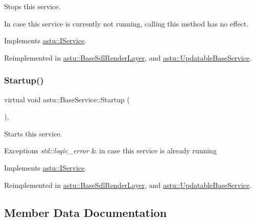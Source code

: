 Stops this service.

In case this service is currently not running, calling this method has no effect. 

Implements \hyperlink{classastu_1_1IService_a67643385e7cc17c31e0b3b49672b5856}{astu\+::\+I\+Service}.



Reimplemented in \hyperlink{classastu_1_1BaseSdlRenderLayer_a786ae49f41873d498ae0d22a0f3a5349}{astu\+::\+Base\+Sdl\+Render\+Layer}, and \hyperlink{classastu_1_1UpdatableBaseService_a7ad7e0201007878b6014361dd5ba82f9}{astu\+::\+Updatable\+Base\+Service}.

\mbox{\label{classastu_1_1BaseService_a59dade033dcb44dd32155c526a3a58e2}} 
\subsubsection{\texorpdfstring{Startup()}{Startup()}}
{\footnotesize\ttfamily virtual void astu\+::\+Base\+Service\+::\+Startup (\begin{DoxyParamCaption}{ }\end{DoxyParamCaption})\hspace{0.3cm}{\ttfamily [override]}, {\ttfamily [virtual]}}

Starts this service.


\begin{DoxyExceptions}{Exceptions}
{\em std\+::logic\+\_\+error} & in case this service is already running \\
\hline
\end{DoxyExceptions}


Implements \hyperlink{classastu_1_1IService_a7a09e485d116659f174aca9a8494fa55}{astu\+::\+I\+Service}.



Reimplemented in \hyperlink{classastu_1_1BaseSdlRenderLayer_a0f4fbd9bbd5613589a8f1ce39d8b6340}{astu\+::\+Base\+Sdl\+Render\+Layer}, and \hyperlink{classastu_1_1UpdatableBaseService_a47e3725f717cee3cd8983f485b2a0243}{astu\+::\+Updatable\+Base\+Service}.



\subsection{Member Data Documentation}
\mbox{\label{classastu_1_1BaseService_a9483b26ad631bd14646ef2d2170cd828}} 
